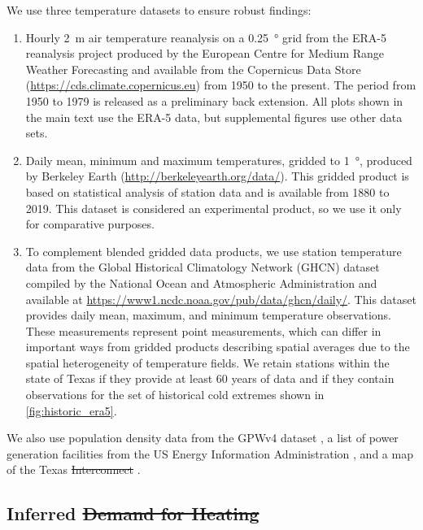 \documentclass[12pt]{iopart}
\providecommand{\DIFaddtex}[1]{{\protect\color{blue}\uwave{#1}}} %
\providecommand{\DIFdeltex}[1]{{\protect\color{red}\sout{#1}}}                      %
\providecommand{\DIFaddbegin}{} %
\providecommand{\DIFaddend}{} %
\providecommand{\DIFdelbegin}{} %
\providecommand{\DIFdelend}{} %
\providecommand{\DIFadd}[1]{\texorpdfstring{\DIFaddtex{#1}}{#1}} %
\providecommand{\DIFdel}[1]{\texorpdfstring{\DIFdeltex{#1}}{}} %
\newcommand{\DIFscaledelfig}{0.5}
\newlength{\DIFdelgraphicswidth} %
\newlength{\DIFdelgraphicsheight} %
\newcommand{\DIFaddincludegraphics}[2][]{{\color{blue}\fbox{\DIFOincludegraphics[#1]{#2}}}} %
\newcommand{\DIFdelincludegraphics}[2][]{%
\sbox{\DIFdelgraphicsbox}{\DIFOincludegraphics[#1]{#2}}%
\settoboxwidth{\DIFdelgraphicswidth}{\DIFdelgraphicsbox} %
\settoboxtotalheight{\DIFdelgraphicsheight}{\DIFdelgraphicsbox} %
\scalebox{\DIFscaledelfig}{%
\parbox[b]{\DIFdelgraphicswidth}{\usebox{\DIFdelgraphicsbox}\\[-\baselineskip] \rule{\DIFdelgraphicswidth}{0em}}\llap{\resizebox{\DIFdelgraphicswidth}{\DIFdelgraphicsheight}{%
\setlength{\unitlength}{\DIFdelgraphicswidth}%
\begin{picture}(1,1)%
\thicklines\linethickness{2pt} %
{\color[rgb]{1,0,0}\put(0,0){\framebox(1,1){}}}%
{\color[rgb]{1,0,0}\put(0,0){\line( 1,1){1}}}%
{\color[rgb]{1,0,0}\put(0,1){\line(1,-1){1}}}%
\end{picture}%
}\hspace*{3pt}}} %
} %
\DeclareRobustCommand{\DIFaddbegin}{\DIFOaddbegin \let\includegraphics\DIFaddincludegraphics} %
\DeclareRobustCommand{\DIFaddend}{\DIFOaddend \let\includegraphics\DIFOincludegraphics} %
\DeclareRobustCommand{\DIFdelbegin}{\DIFOdelbegin \let\includegraphics\DIFdelincludegraphics} %
\DeclareRobustCommand{\DIFdelend}{\DIFOaddend \let\includegraphics\DIFOincludegraphics} %
\begin{document}
We use three temperature datasets to ensure robust findings:
\begin{enumerate}
  \item Hourly \SI{2}{\meter} air temperature reanalysis on a \SI{0.25}{\degree} grid from the ERA-5 reanalysis project produced by the European Centre for Medium Range Weather Forecasting \cite{hersbach_era5:2020} and available  from the Copernicus Data Store (\url{https://cds.climate.copernicus.eu}) from 1950 to the present.
        The period from 1950 to 1979 is released as a preliminary back extension.
        All plots shown in the main text use the ERA-5 data, but supplemental figures use other data sets.
  \item Daily mean, minimum and maximum temperatures, gridded to \SI{1}{\degree}, produced by Berkeley Earth (\url{http://berkeleyearth.org/data/}).
        This gridded product is based on statistical analysis of station data and is available from 1880 to 2019.
        This dataset is considered an experimental product, so we use it only for comparative purposes.
  \item To complement blended gridded data products, we use station temperature data from the Global Historical Climatology Network (GHCN) dataset compiled by the National Ocean and Atmospheric Administration \cite{Menne:2012hk} and available at \url{https://www1.ncdc.noaa.gov/pub/data/ghcn/daily/}.
        This dataset provides daily mean, maximum, and minimum temperature observations.
        These measurements represent point measurements, which can differ in important ways from gridded products describing spatial averages due to the spatial heterogeneity of temperature fields.
        We retain stations within the state of Texas if they provide at least 60 years of data and if they contain observations for the set of historical cold extremes shown in \cref{fig:historic_era5}.
\end{enumerate}
We also use population density data from the GPWv4 dataset \cite{ciesin_gpwv4:2016}, a list of power generation facilities from the US Energy Information Administration \cite{useia_generators:2021}, and a map of the Texas \DIFdelbegin \DIFdel{Interconnect }\DIFdelend \DIFaddbegin \DIFadd{Interconnection }\DIFaddend \cite{useia_regions:2021}.


\subsection{Inferred \DIFdelbegin \DIFdel{Demand for Heating}\DIFdelend \DIFaddbegin \DIFadd{heating demand per capita}\DIFaddend }\label{sec:inferred-demand}
\end{document}
